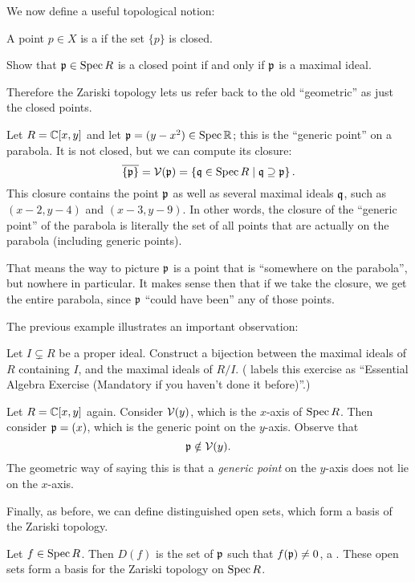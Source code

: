 We now define a useful topological notion:
\begin{definition}
	A point $p \in X$ is a  if the set $\{p\}$ is closed.
\end{definition}
\begin{ques}
	Show that $\mathfrak p \in \operatorname{Spec} R$ is a closed point
	if and only if $\mathfrak p$ is a maximal ideal.
\end{ques}
Therefore the Zariski topology lets us refer back to the old ``geometric''
as just the closed points.
\begin{example}
	Let $R = \mathbb C[x,y]$ and let $\mathfrak p = (y-x^2) \in \operatorname{Spec} \mathbb R$;
	this is the ``generic point'' on a parabola.
	It is not closed, but we can compute its closure:
	\[
		\overline{\{\mathfrak p\}}
		= \mathcal V(\mathfrak p) = \left\{ \mathfrak q \in \operatorname{Spec} R \mid \mathfrak q \supseteq \mathfrak p \right\}.
	\]
	This closure contains the point $\mathfrak p$ as well
	as several maximal ideals $\mathfrak q$, such as $(x-2,y-4)$ and $(x-3,y-9)$.
	In other words, the closure of the ``generic point'' of the parabola
	is literally the set of all points that are actually on the parabola
	(including generic points).

	That means the way to picture $\mathfrak p$ is a point that 
	is ``somewhere on the parabola'', but nowhere in particular.
	It makes sense then that if we take the closure,
	we get the entire parabola,
	since $\mathfrak p$ ``could have been'' any of those points.
\end{example}
The previous example illustrates an important observation:
\begin{exercise}
	Let $I \subsetneq R$ be a proper ideal.
	Construct a bijection between the maximal ideals of $R$ containing $I$,
	and the maximal ideals of $R/I$.
	(\cite{ref:vakil} labels this exercise as
	``Essential Algebra Exercise (Mandatory if you haven't done it before)''.)
\end{exercise}

\begin{example}
	Let $R = \mathbb C[x,y]$ again.
	Consider $\mathcal V(y)$, which is the $x$-axis of $\operatorname{Spec} R$.
	Then consider $\mathfrak p = (x)$, which is the generic point on the $y$-axis.
	Observe that
	\[ \mathfrak p \notin \mathcal V(y). \]
	The geometric way of saying this is that a \emph{generic point}
	on the $y$-axis does not lie on the $x$-axis.
\end{example}

Finally, as before, we can define distinguished open sets,
which form a basis of the Zariski topology.
\begin{definition}
	Let $f \in \operatorname{Spec} R$.
	Then $D(f)$ is the set of $\mathfrak p$ such that $f(\mathfrak p) \neq 0$,
	a .
	These open sets form a basis for the Zariski topology on $\operatorname{Spec} R$.
\end{definition}

